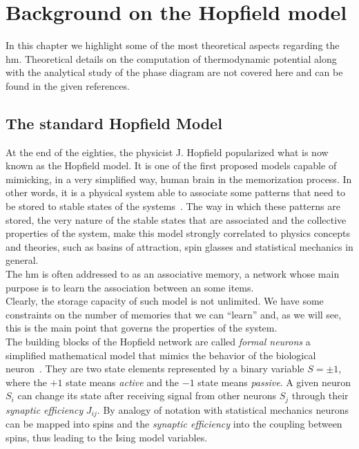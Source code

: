 \documentclass[\rootdir/main.tex]{subfiles}
\begin{document}
\chapter{Background on the Hopfield model}\label{chap:hopfield}
In this chapter we highlight some of the most theoretical aspects regarding the \acrlong{hm}. Theoretical details on the computation of thermodynamic potential along with the analytical study of the phase diagram are not covered here and can be found in the given references.
\section{The standard Hopfield Model}\label{sec:standard_hop}
At the end of the eighties, the physicist J. Hopfield popularized what is now known as the Hopfield model.
It is one of the first proposed models capable of mimicking, in a very simplified way, human brain in the memorization process. In other words, it is a physical system able to associate some patterns that need to be stored to stable states of the systems~\cite{JJHop}. The way in which these patterns are stored, the very nature of the stable states that are associated and the collective properties of the system, make this model strongly correlated to physics concepts and theories, such as basins of attraction, spin glasses and statistical mechanics in general.\\
The \acrlong{hm} is often addressed to as an associative memory, \ie a network whose main purpose is to learn the association between an some items.\\
Clearly, the storage capacity of such model is not unlimited. We have some constraints on the number of memories that we can ``learn'' and, as we will see, this is the main point that governs the properties of the system.\\
The building blocks of the Hopfield network are called \emph{formal neurons} \ie a simplified mathematical model that mimics the behavior of the biological neuron~\cite{formal_neuron, statmecoflearn}. They are two state elements represented by a binary variable $S = \pm 1$, where the $+1$ state means \emph{active} and the $-1$ state means \emph{passive}.
A given neuron $S_i$ can change its state after receiving signal from other neurons $S_j$ through their \emph{synaptic efficiency} $J_{ij}$. By analogy of notation with statistical mechanics neurons can be mapped into spins and the \emph{synaptic efficiency} into the coupling between spins, thus leading to the Ising model variables.\\
\end{document}
